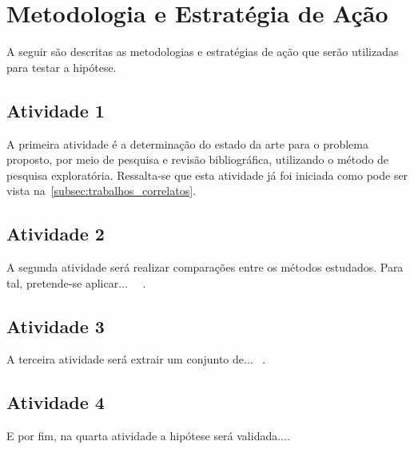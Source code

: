\section{Metodologia e Estratégia de Ação} \label{sec:metodologia}

A seguir são descritas as metodologias e estratégias de ação que serão utilizadas para testar a hipótese.

\subsection{Atividade 1} \label{subsec:atividade1}
A primeira atividade é a determinação do estado da arte para o problema proposto, por meio de pesquisa e revisão bibliográfica, utilizando o método de pesquisa exploratória. Ressalta-se que esta atividade já foi iniciada como pode ser vista na~\autoref{subsec:trabalhos_correlatos}.

\subsection{Atividade 2} \label{subsec:atividade2}
A segunda atividade será realizar comparações entre os métodos estudados. Para tal, pretende-se aplicar...
~\lipsum[34]~\cite{book}.

\subsection{Atividade 3} \label{subsec:atividade3}
A terceira atividade será extrair um conjunto de... \lipsum[65]~\cite{techreport}.

\subsection{Atividade 4} \label{subsec:atividade4}
E por fim, na quarta atividade a hipótese será validada...\lipsum[20].